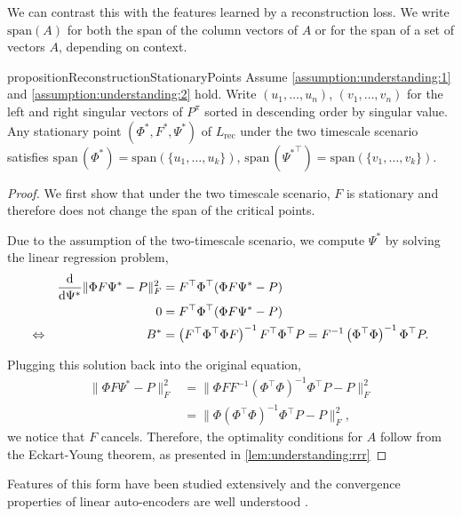 We can contrast this with the features learned by a reconstruction loss.
We write $\mathrm{span}(A)$ for both the span of the column vectors of $A$ or for the span of a set of vectors $A$, depending on context.
\begin{restatable}{proposition}{ReconstructionStationaryPoints}\label{prop:understanding:2}
Assume \autoref{assumption:understanding:1} and \autoref{assumption:understanding:2} hold. Write $(u_1,\dots,u_n)$, $(v_1,\dots,v_n)$ for the left and right singular vectors of $P^\pi$ sorted in descending order by singular value. Any stationary point $(\Phi^*, F^*, \Psi^*)$ of $L_\text{rec}$ under the two timescale scenario satisfies $\mathrm{span}\,(\Phi^*)=\mathrm{span}\left(\{u_1,\dots,u_k\}\right)$, $\mathrm{span}\,({\Psi^*}^\top)=\mathrm{span}\left(\{v_1,\dots,v_k\}\right)$.
\end{restatable}
\begin{proof}
We first show that under the two timescale scenario, $F$ is stationary and therefore does not change the span of the critical points.

Due to the assumption of the two-timescale scenario, we compute $\Psi^*$ by solving the linear regression problem,
\begin{align}
    &&\frac{\mathrm{d}}{\mathrm{d} \Psi^*} \lVert \Phi F\Psi^* - P \rVert_F^2 &= F^\top {\Phi}^\top ({\Phi}F\Psi^* - P)\\
    &&0 &=  F^\top {\Phi}^\top ({\Phi}F\Psi^* - P)\\
    \Leftrightarrow && B^* &= \left(F^\top {\Phi}^\top {\Phi}F\right)^{-1} F^\top \Phi^\top P = F^{-1}\left(\Phi^\top \Phi\right)^{-1} \Phi^\top P.
\end{align}

Plugging this solution back into the original equation, 
\begin{align}
    \lVert \Phi F\Psi^* - P \rVert_F^2 &= \lVert \Phi FF^{-1}\left(\Phi^\top \Phi\right)^{-1} \Phi^\top P - P \rVert_F^2\\
    &= \lVert \Phi \left(\Phi^\top \Phi\right)^{-1} \Phi^\top P - P \rVert_F^2,
\end{align}
we notice that $F$ cancels.
Therefore, the optimality conditions for $A$ follow from the Eckart-Young theorem, as presented in \autoref{lem:understanding:rrr}
\end{proof}


Features of this form have been studied extensively and the convergence properties of linear auto-encoders are well understood \parencite{baldi1989neural,pretorius2018learning,bao2020regularized}.

